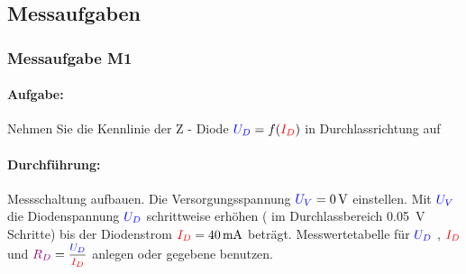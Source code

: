 \documentclass[11pt,a4paper,titlepage]{scrreprt}
\begin{document}
          \subsection{Messaufgaben}
            \subsubsection{Messaufgabe M1}
              \paragraph{Aufgabe:} Nehmen Sie die Kennlinie der Z - Diode $\textcolor{blue}{U_D} = f(\textcolor{red}{I_D})$ in Durchlassrichtung auf
              \paragraph{Durchführung:} Messschaltung aufbauen. Die Versorgungsspannung $\textcolor{blue}{U_V} = \SI{0}{\volt}$ einstellen. Mit $\textcolor{blue}{U_V}$ die Diodenspannung $\textcolor{blue}{U_D}$ schrittweise erhöhen ( im Durchlassbereich \SI{0,05}{\volt} Schritte) bis der Diodenstrom $\textcolor{red}{I_D} = \SI{40}{\milli\ampere}$ beträgt. Messwertetabelle für $\textcolor{blue}{U_D}$ , $\textcolor{red}{I_D}$ und $\widerstand{R_D} = \mfrac{\spannung{U_D}}{\strom{I_D}}$ anlegen oder gegebene benutzen.
\end{document}
